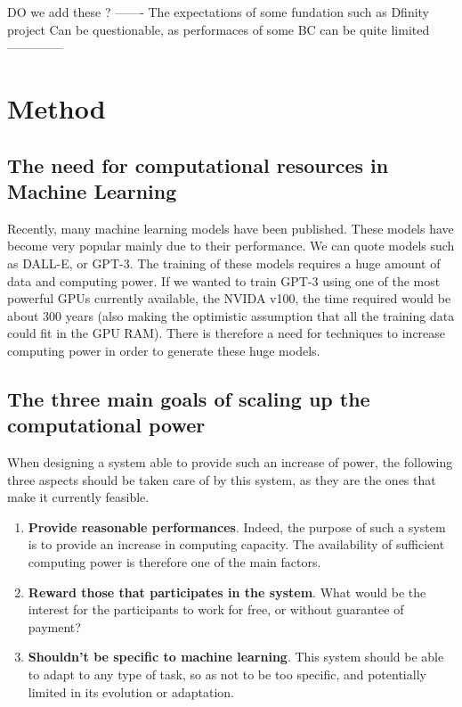 \documentclass{article}
\begin{document}
DO we add these ? -------
The expectations of some fundation such as Dfinity project
Can be questionable, as performaces of some BC can be quite limited
--------------
\section{Method}
\subsection{The need for computational resources in Machine Learning}
Recently, many machine learning models have been published. These models have become very popular mainly due to their
performance. We can quote models such as DALL-E, or GPT-3. The training of these models requires a huge amount of data
and computing power. If we wanted to train GPT-3 using one of the most powerful GPUs currently available,
the NVIDA v100, the time required would be about 300 years (also making the optimistic assumption that all the
training data could fit in the GPU RAM). There is therefore a need for techniques to increase computing power in order
to generate these huge models.
\subsection{The three main goals of scaling up the computational power}
When designing a system able to provide such an increase of power, the following three aspects should be taken care of
by this system, as they are the ones that make it currently feasible.
\begin{enumerate}
    \item \textbf{Provide reasonable performances}. Indeed, the purpose of such a system is to provide an increase in computing
     capacity. The availability of sufficient computing power is therefore one of the main factors.
    \item \textbf{Reward those that participates in the system}. What would be the interest for the participants to work for
     free, or without guarantee of payment?
    \item \textbf{Shouldn't be specific to machine learning}. This system should be able to adapt to any type of task, so as not
     to be too specific, and potentially limited in its evolution or adaptation.
\end{enumerate}
\end{document}

